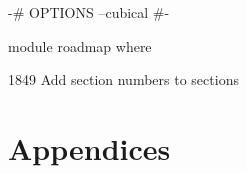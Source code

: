 \documentclass[11pt, a4paper]{article}
\begin{document}
\thispagestyle{empty}

\newpage

\begin{spacing}{0.0}
\tableofcontents
\end{spacing}

\thispagestyle{empty}

\newpage
\setcounter{page}{1}

\begin{code}[hide]
{-# OPTIONS --cubical #-}

module roadmap where
\end{code}

1849
Add section numbers to sections

% 

% 



% 

% 

% 

% 


% 

% 


% 

\newpage




\newpage
\section{Appendices}
\end{document}
